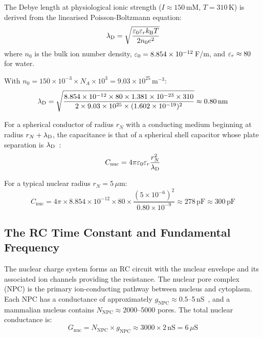 The Debye length at physiological ionic strength ($I \approx 150$\,mM, $T = 310$\,K) is derived from the linearised Poisson-Boltzmann equation:
\begin{equation}
  \lambda_{\mathrm{D}} = \sqrt{\frac{\varepsilon_{0} \varepsilon_r k_{\mathrm{B}} T}{2 n_0 e^2}}
  \label{v:eq:debye_length}
\end{equation}
where $n_0$ is the bulk ion number density, $\varepsilon_{0} = 8.854 \times 10^{-12}$\,F/m, and $\varepsilon_r \approx 80$ for water.

With $n_0 = 150 \times 10^{-3} \times N_A \times 10^3 = 9.03 \times 10^{25}$\,m$^{-3}$:
\begin{equation}
  \lambda_{\mathrm{D}} = \sqrt{\frac{8.854 \times 10^{-12} \times 80 \times 1.381 \times 10^{-23} \times 310}{2 \times 9.03 \times 10^{25} \times (1.602 \times 10^{-19})^2}} \approx 0.80\,\mathrm{nm}
  \label{v:eq:debye_numerical}
\end{equation}

For a spherical conductor of radius $r_N$ with a conducting medium beginning at radius $r_N + \lambda_{\mathrm{D}}$, the capacitance is that of a spherical shell capacitor whose plate separation is $\lambda_{\mathrm{D}}$~\cite{Griffiths1999}:
\begin{equation}
  C_{\mathrm{nuc}} = 4\pi \varepsilon_{0} \varepsilon_r \frac{r_N^2}{\lambda_{\mathrm{D}}}
  \label{v:eq:nuclear_capacitance}
\end{equation}

For a typical nuclear radius $r_N = 5\,\mu$m:
\begin{equation}
  C_{\mathrm{nuc}} = 4\pi \times 8.854 \times 10^{-12} \times 80 \times \frac{(5 \times 10^{-6})^2}{0.80 \times 10^{-9}} \approx 278\,\mathrm{pF} \approx 300\,\mathrm{pF}
  \label{v:eq:nuclear_cap_numerical}
\end{equation}

\subsection{The RC Time Constant and Fundamental Frequency}

The nuclear charge system forms an RC circuit with the nuclear envelope and its associated ion channels providing the resistance. The nuclear pore complex (NPC) is the primary ion-conducting pathway between nucleus and cytoplasm. Each NPC has a conductance of approximately $g_{\mathrm{NPC}} \approx 0.5$--5\,nS~\cite{Bustamante2000,Shahin2001}, and a mammalian nucleus contains $N_{\mathrm{NPC}} \approx 2000$--5000 pores. The total nuclear conductance is:
\begin{equation}
  G_{\mathrm{nuc}} = N_{\mathrm{NPC}} \times g_{\mathrm{NPC}} \approx 3000 \times 2\,\mathrm{nS} = 6\,\mu\mathrm{S}
\end{equation}

